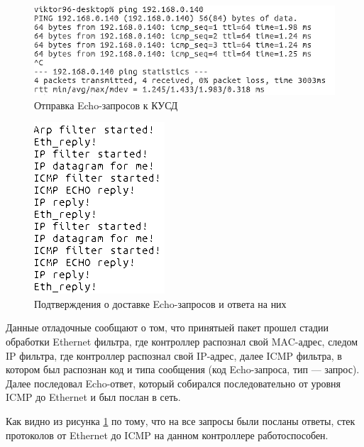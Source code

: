 \begin{figure}[h!]
	\centering
		\includegraphics[scale=0.8]{img/icmp-req.png}
	\caption{Отправка Echo-запросов к КУСД\label{fig:echo-req}}
\end{figure}

\begin{figure}[h!]
	\centering
		\includegraphics[scale=1.0]{img/echo-reply-log.png}
	\caption{Подтверждения о доставке Echo-запросов и ответа на них\label{fig:echo-reply-log}}
\end{figure}

Данные отладочные сообщают о том, что принятыей пакет прошел стадии обработки Ethernet фильтра, где контроллер распознал свой MAC-адрес, следом IP фильтра, где контроллер распознал свой IP-адрес, далее ICMP фильтра, в котором был распознан код и типа сообщения (код Echo-запроса, тип --- запрос). Далее последовал Echo-ответ, который собирался последовательно от уровня ICMP до Ethernet и был послан в сеть.

Как видно из рисунка \ref{fig:echo-req} по тому, что на все запросы были посланы ответы, стек протоколов от Ethernet до ICMP на данном контроллере работоспособен.



